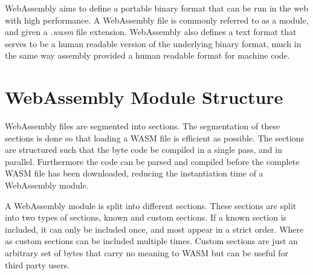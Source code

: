 \documentclass[11pt]{book}
\begin{document}
WebAssembly aims to define a portable binary format that can be run in the web with high performance. A WebAssembly file is commonly referred to as a module, and given a \textit{.wasm} file extension. WebAssembly also defines a text format that serves to be a human readable version of the underlying binary format, much in the same way assembly provided a human readable format for machine code. 



\section{WebAssembly Module Structure}

WebAssembly files are segmented into sections. The segmentation of these sections is done so that loading a WASM file is efficient as possible. The sections are structured such that the byte code be compiled in a single pass, and in parallel. Furthermore the code can be parsed and compiled before the complete WASM file has been downloaded, reducing the instantiation time of a WebAssembly module. 

A WebAssembly module is split into different sections. These sections are split into two types of sections, known and custom sections. If a known section is included, it can only be included once, and most appear in a strict order. Where as custom sections can be included multiple times. Custom sections are just an arbitrary set of bytes that carry no meaning to WASM but can be useful for third party users. 
\end{document}
